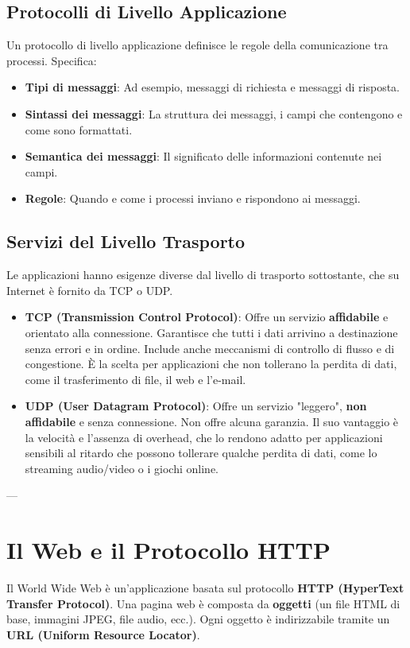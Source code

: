 \subsection{Protocolli di Livello Applicazione}
Un protocollo di livello applicazione definisce le regole della comunicazione tra processi. Specifica:
\begin{itemize}
    \item \textbf{Tipi di messaggi}: Ad esempio, messaggi di richiesta e messaggi di risposta.
    \item \textbf{Sintassi dei messaggi}: La struttura dei messaggi, i campi che contengono e come sono formattati.
    \item \textbf{Semantica dei messaggi}: Il significato delle informazioni contenute nei campi.
    \item \textbf{Regole}: Quando e come i processi inviano e rispondono ai messaggi.
\end{itemize}


\subsection{Servizi del Livello Trasporto}
Le applicazioni hanno esigenze diverse dal livello di trasporto sottostante, che su Internet è fornito da TCP o UDP.
\begin{itemize}
    \item \textbf{TCP (Transmission Control Protocol)}: Offre un servizio \textbf{affidabile} e orientato alla connessione. Garantisce che tutti i dati arrivino a destinazione senza errori e in ordine. Include anche meccanismi di controllo di flusso e di congestione. È la scelta per applicazioni che non tollerano la perdita di dati, come il trasferimento di file, il web e l'e-mail.
    \item \textbf{UDP (User Datagram Protocol)}: Offre un servizio "leggero", \textbf{non affidabile} e senza connessione. Non offre alcuna garanzia. Il suo vantaggio è la velocità e l'assenza di overhead, che lo rendono adatto per applicazioni sensibili al ritardo che possono tollerare qualche perdita di dati, come lo streaming audio/video o i giochi online.
\end{itemize}

---
\section{Il Web e il Protocollo HTTP}
Il World Wide Web è un'applicazione basata sul protocollo \textbf{HTTP (HyperText Transfer Protocol)}. Una pagina web è composta da \textbf{oggetti} (un file HTML di base, immagini JPEG, file audio, ecc.). Ogni oggetto è indirizzabile tramite un \textbf{URL (Uniform Resource Locator)}.

